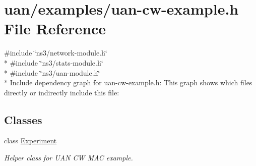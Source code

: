\hypertarget{uan-cw-example_8h}{}\section{uan/examples/uan-\/cw-\/example.h File Reference}
\label{uan-cw-example_8h}
{\ttfamily \#include \char`\"{}ns3/network-\/module.\+h\char`\"{}}\\*
{\ttfamily \#include \char`\"{}ns3/stats-\/module.\+h\char`\"{}}\\*
{\ttfamily \#include \char`\"{}ns3/uan-\/module.\+h\char`\"{}}\\*
Include dependency graph for uan-\/cw-\/example.h\+:
This graph shows which files directly or indirectly include this file\+:
\subsection*{Classes}
\begin{DoxyCompactItemize}
\item 
class \hyperlink{classExperiment}{Experiment}
\begin{DoxyCompactList}\small\item\em Helper class for U\+AN CW M\+AC example. \end{DoxyCompactList}\end{DoxyCompactItemize}
